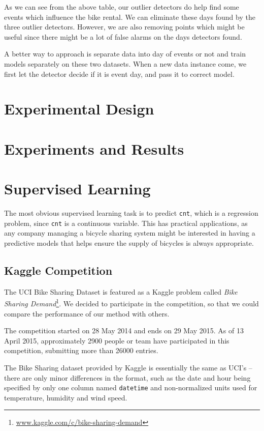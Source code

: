 \documentclass[12pt]{article}
\begin{document}
 	As we can see from the above table, our outlier detectors do help find some events which influence the bike rental. We can eliminate these days found by the three outlier detectors. However, we are also removing points which might be useful since there might be a lot of false alarms on the days detectors found.  
 	
 	A better way to approach is separate data into day of events or not and train models separately on these two datasets. When a new data instance come, we first let the detector decide if it is event day, and pass it to correct model.
	
\section{Experimental Design}
\label{sec:experimental-design}


\section{Experiments and Results}
\label{sec:experiments-and-results}

\section{Supervised Learning}
\label{supervised learning}

The most obvious supervised learning task is to predict \texttt{cnt}, which is a regression problem, since \texttt{cnt} is a continuous variable. This has practical applications, as any company managing a bicycle sharing system might be interested in having a predictive models that helps ensure the supply of bicycles is always appropriate.

\subsection{Kaggle Competition}

The UCI Bike Sharing Dataset is featured as a Kaggle problem called \emph{Bike Sharing Demand}\footnote{\url{www.kaggle.com/c/bike-sharing-demand}}. We decided to participate in the competition, so that we could compare the performance of our method with others.

The competition started on 28 May 2014 and ends on 29 May 2015. As of 13 April 2015, approximately 2900 people or team have participated in this competition, submitting more than 26000 entries.

The Bike Sharing dataset provided by Kaggle is essentially the same as UCI's -- there are only minor differences in the format, such as the date and hour being specified by only one column named \texttt{datetime} and non-normalized units used for temperature, humidity and wind speed.
\end{document}
